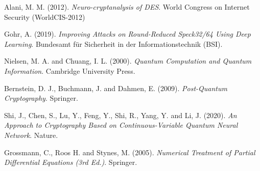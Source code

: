 \documentclass[%
    corpo=11pt,
    twoside,
    stile=classica,
    oldstyle,
    autoretitolo,
    tipotesi=magistrale,
    greek,
    evenboxes,
    english
]{toptesi}
\begin{document}
\begin{thebibliography}{99}
 {\sc Alani, M. M.} (2012). \textit{Neuro-cryptanalysis of DES}. World Congress on Internet Security (WorldCIS-2012)

 {\sc Gohr, A.} (2019). \textit{Improving Attacks on Round-Reduced Speck32/64 Using Deep Learning}. Bundesamt für Sicherheit in der Informationstechnik (BSI).

 {\sc Nielsen, M. A.} and {\sc Chuang, I. L.} (2000). \textit{Quantum Computation and Quantum Information}. Cambridge University Press.

 {\sc Bernstein, D. J.}, {\sc Buchmann, J.} and {\sc Dahmen, E.} (2009). \textit{Post-Quantum Cryptography}. Springer.

 {\sc Shi, J.}, {\sc Chen, S.}, {\sc Lu, Y.}, {\sc Feng, Y.}, {\sc Shi, R.}, {\sc Yang, Y.} and {\sc Li, J.} (2020). \textit{An Approach to Cryptography Based on Continuous-Variable Quantum Neural Network}. Nature.

 {\sc Grossmann, C.}, {\sc Roos H.} and {\sc Stynes, M.} (2005). \textit{Numerical Treatment of Partial Differential Equations (3rd Ed.)}. Springer.
\end{thebibliography}
\end{document}
